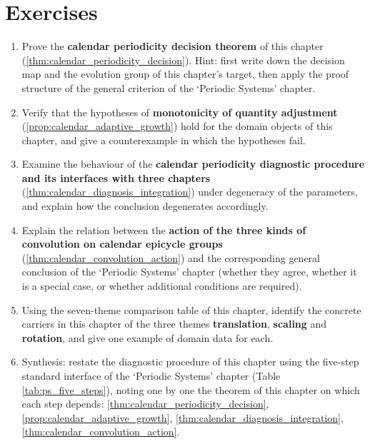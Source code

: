 \section*{Exercises}

\begin{enumerate}[leftmargin=3em, label=\textbf{Exercise \arabic*}]
    \item Prove the \textbf{calendar periodicity decision theorem} of this chapter (\ref{thm:calendar_periodicity_decision}). Hint: first write down the decision map and the evolution group of this chapter's target, then apply the proof structure of the general criterion of the `Periodic Systems' chapter.

    \item Verify that the hypotheses of \textbf{monotonicity of quantity adjustment} (\ref{prop:calendar_adaptive_growth}) hold for the domain objects of this chapter, and give a counterexample in which the hypotheses fail.

    \item Examine the behaviour of the \textbf{calendar periodicity diagnostic procedure and its interfaces with three chapters} (\ref{thm:calendar_diagnosis_integration}) under degeneracy of the parameters, and explain how the conclusion degenerates accordingly.

    \item Explain the relation between the \textbf{action of the three kinds of convolution on calendar epicycle groups} (\ref{thm:calendar_convolution_action}) and the corresponding general conclusion of the `Periodic Systems' chapter (whether they agree, whether it is a special case, or whether additional conditions are required).

    \item Using the seven-theme comparison table of this chapter, identify the concrete carriers in this chapter of the three themes \textbf{translation}, \textbf{scaling} and \textbf{rotation}, and give one example of domain data for each.

    \item Synthesis: restate the diagnostic procedure of this chapter using the five-step standard interface of the `Periodic Systems' chapter (Table \ref{tab:ps_five_steps}), noting one by one the theorem of this chapter on which each step depends: \ref{thm:calendar_periodicity_decision}, \ref{prop:calendar_adaptive_growth}, \ref{thm:calendar_diagnosis_integration}, \ref{thm:calendar_convolution_action}.
\end{enumerate}


